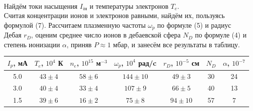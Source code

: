 \documentclass[a4paper,12pt]{article}
\begin{document}
\begin{figure}[h]
    \centering
    \\
\end{figure}
Найдём токи насыщения $I_{i\text{н}}$ и температуры электронов $T_e$.\\
Считая концентрации ионов и электронов равными, найдём их, пользуясь формулой (7). Рассчитаем плазменную частоты $\omega_p$ по формуле (5) и радиус Дебая $r_D$, оценим среднее число ионов в дебаевской сфера $N_D$ по формуле (4) и  степень ионизации $\alpha$, приняв $P\approx 1$ мбар, и занесём все результаты в таблицу.
\begin{table}[h!]
\centering
\begin{tabular}{|c|c|c|c|c|c|c|}
\hline
$I_p$, мА  & $T_e$, $10^4$ К   & $n_e$, $10^{15}$ м$^{-3}$ & $\omega_p$, $10^4$ рад/c & $r_D$, $10^{-5}$ см & $N_D$ & $\alpha$, $10^{-7}$ \\ \hline
5.0   & $43\pm 4$ & $58\pm 6$                     & $144\pm 10$                   & $49\pm 3$                      & 30 & 24\\ \hline
3.0   & $40\pm 4$ & $33\pm 4$                     & $107\pm 9$                    & $66\pm 5$                      & 40 & 13\\ \hline
1.5   & $39\pm 6$ & $16\pm 2$                    & $75\pm 8$                     & $94 \pm 10$                     & 57 & 7\\ \hline
\end{tabular}
\end{table}
\newpage
\end{document}
